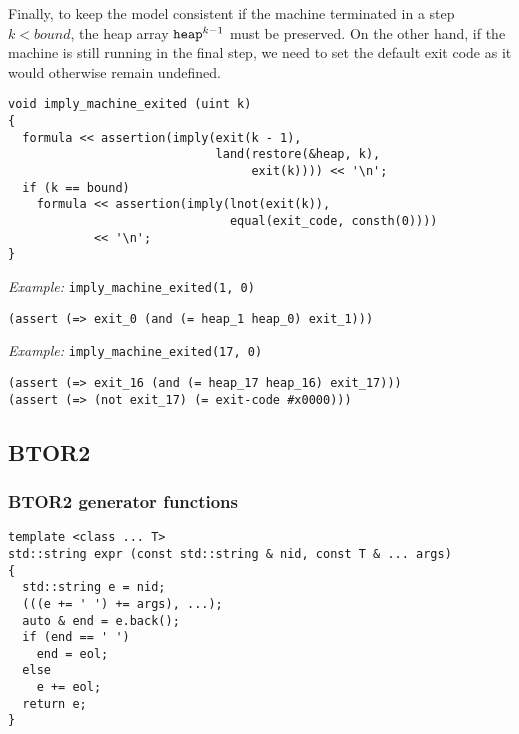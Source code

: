 \noindent
Finally, to keep the model consistent if the machine terminated in a step $k < bound$, the heap array $\texttt{heap}^{k - 1}$ must be preserved.
On the other hand, if the machine is still running in the final step,
we need to set the default exit code as it would otherwise remain undefined.

\begin{lstlisting}[style=c++]
void imply_machine_exited (uint k)
{
  formula << assertion(imply(exit(k - 1),
                             land(restore(&heap, k),
                                  exit(k)))) << '\n';
  if (k == bound)
    formula << assertion(imply(lnot(exit(k)),
                               equal(exit_code, consth(0))))
            << '\n';
}
\end{lstlisting}

\noindent
\emph{Example:} \lstinline[style=c++]{imply_machine_exited(1, 0)}

\begin{lstlisting}[language=SMTLib]
(assert (=> exit_0 (and (= heap_1 heap_0) exit_1)))
\end{lstlisting}

\noindent
\emph{Example:} \lstinline[style=c++]{imply_machine_exited(17, 0)}

\begin{lstlisting}[language=SMTLib]
(assert (=> exit_16 (and (= heap_17 heap_16) exit_17)))
(assert (=> (not exit_17) (= exit-code #x0000)))
\end{lstlisting}

\subsection{BTOR2}

\subsubsection{BTOR2 generator functions}

\begin{lstlisting}[style=c++]
template <class ... T>
std::string expr (const std::string & nid, const T & ... args)
{
  std::string e = nid;
  (((e += ' ') += args), ...);
  auto & end = e.back();
  if (end == ' ')
    end = eol;
  else
    e += eol;
  return e;
}
\end{lstlisting}

